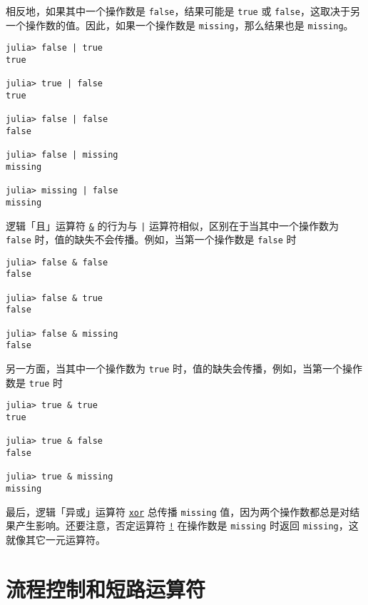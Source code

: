 相反地，如果其中一个操作数是 \texttt{false}，结果可能是 \texttt{true} 或 \texttt{false}，这取决于另一个操作数的值。因此，如果一个操作数是 \texttt{missing}，那么结果也是 \texttt{missing}。




\begin{verbatim}
julia> false | true
true

julia> true | false
true

julia> false | false
false

julia> false | missing
missing

julia> missing | false
missing
\end{verbatim}



逻辑「且」运算符 \hyperlink{1494761116451616317}{\texttt{\&}} 的行为与 \texttt{|} 运算符相似，区别在于当其中一个操作数为 \texttt{false} 时，值的缺失不会传播。例如，当第一个操作数是 \texttt{false} 时




\begin{verbatim}
julia> false & false
false

julia> false & true
false

julia> false & missing
false
\end{verbatim}



另一方面，当其中一个操作数为 \texttt{true} 时，值的缺失会传播，例如，当第一个操作数是 \texttt{true} 时




\begin{verbatim}
julia> true & true
true

julia> true & false
false

julia> true & missing
missing
\end{verbatim}



最后，逻辑「异或」运算符 \hyperlink{7071880015536674935}{\texttt{xor}} 总传播 \texttt{missing} 值，因为两个操作数都总是对结果产生影响。还要注意，否定运算符 \hyperlink{4329035214952292986}{\texttt{!}} 在操作数是 \texttt{missing} 时返回 \texttt{missing}，这就像其它一元运算符。



\hypertarget{354241034752728129}{}


\section{流程控制和短路运算符}



